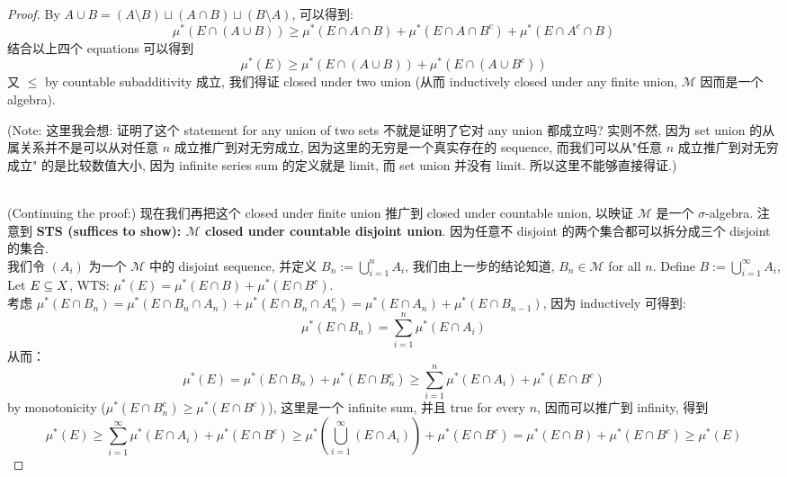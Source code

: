 \documentclass[lang=cn,11pt]{elegantbook}
\begin{document}
\begin{proof}
By  $A \cup B = (A \setminus B) \sqcup (A \cap B) \sqcup (B\setminus A)$, 可以得到:
\begin{equation}
   \mu^*(E \cap (A\cup B)) \geq \mu^*(E\cap  A \cap  B) + \mu^*(E \cap  A \cap  B^c) + \mu^*(E \cap A^c  \cap B)
\end{equation}
结合以上四个 equations 可以得到
\begin{equation}
    \mu^*(E) \geq \mu^*(E \cap (A\cup B)) + \mu^*(E \cap (A \cup B^c))
\end{equation}
又 $\leq$ by countable subadditivity 成立, 我们得证 closed under two union (从而 inductively closed under any finite union, $\mathcal{M}$ 因而是一个 algebra).\\
\begin{remark}
    (Note: 这里我会想: 证明了这个 statement for any union of two sets 不就是证明了它对 any union 都成立吗? 实则不然, 因为 set union 的从属关系并不是可以从对任意 $n$ 成立推广到对无穷成立, 因为这里的无穷是一个真实存在的 sequence, 而我们可以从"任意 $n$ 成立推广到对无穷成立" 的是比较数值大小, 因为 infinite series sum 的定义就是 limit, 而 set union 并没有 limit. 所以这里不能够直接得证.)\\\\
\end{remark}
\noindent (Continuing the proof:)
\noindent 现在我们再把这个 closed under finite union 推广到 closed under countable union, 以映证 $\mathcal{M}$ 是一个 $\sigma$-algebra. 注意到 \textbf{STS (suffices to show): $\mathcal{M}$ closed under countable disjoint union}. 因为任意不 disjoint 的两个集合都可以拆分成三个 disjoint 的集合.\\
\noindent 我们令 $(A_i)$ 为一个 $\mathcal{M}$ 中的 disjoint sequence, 并定义 $B_n := \bigcup_{i=1}^n A_i$, 我们由上一步的结论知道, $B_n \in \mathcal{M}$ for all $n$.  
\noindent Define $B := \bigcup_{i=1}^\infty A_i$,  Let $E\subseteq X$, WTS: $\mu^*(E ) = \mu^*(E \cap B) + \mu^*(E\cap B^c)$.
\\
\noindent 考虑 $\mu^*(E \cap B_n ) = \mu^*(E \cap  B_n \cap A_n) + \mu^*(E \cap B_n \cap A_n^c) = \mu^*(E \cap  A_n) + \mu^*(E \cap B_{n-1})$, 因为 inductively 可得到:
\begin{equation}
    \mu^*(E \cap  B_n) = \sum_{i=1}^n \mu^*(E \cap A_i)
\end{equation}
\noindent 从而：
\begin{equation}
    \mu^*(E) = \mu^*(E \cap  B_n) + \mu^*(E \cap  B_n^c) \geq \sum_{i=1}^n \mu^*(E\cap A_i) + \mu^*(E \cap B^c)
\end{equation}
\noindent by monotonicity ($\mu^*(E \cap B_n^c) \geq \mu^*(E \cap B^c)$), 这里是一个 infinite sum, 并且 true for every $n$, 因而可以推广到 infinity, 得到 
\begin{equation}
    \mu^*(E) \geq \sum_{i=1}^\infty \mu^*(E \cap A_i) + \mu^*(E  \cap B^c) \geq \mu^*(\bigcup_{i=1}^\infty (E \cap A_i)) + \mu^*(E  \cap B^c) = \mu^*(E \cap B) + \mu^*(E \cap B^c) \geq \mu^*(E)
\end{equation}
\end{proof}
\end{document}
